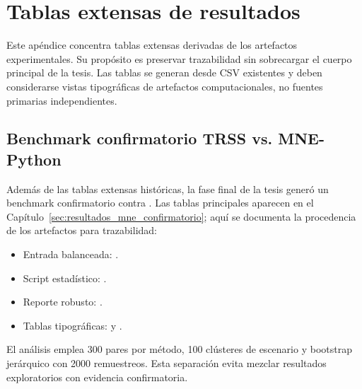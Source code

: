 \chapter{Tablas extensas de resultados}
\label{app:tablas_extensas}
Este apéndice concentra tablas extensas derivadas de los artefactos experimentales. Su propósito es preservar trazabilidad sin sobrecargar el cuerpo principal de la tesis. Las tablas se generan desde CSV existentes y deben considerarse vistas tipográficas de artefactos computacionales, no fuentes primarias independientes.


\section{Benchmark confirmatorio TRSS vs. MNE-Python}
\label{app:trss_mne_confirmatorio}
Además de las tablas extensas históricas, la fase final de la tesis generó un benchmark confirmatorio contra . Las tablas principales aparecen en el Capítulo~\ref{sec:resultados_mne_confirmatorio}; aquí se documenta la procedencia de los artefactos para trazabilidad:
\begin{itemize}
  \item Entrada balanceada: .
  \item Script estadístico: .
  \item Reporte robusto: .
  \item Tablas tipográficas:  y .
\end{itemize}
El análisis emplea 300 pares por método, 100 clústeres de escenario y bootstrap jerárquico con 2000 remuestreos. Esta separación evita mezclar resultados exploratorios con evidencia confirmatoria.



